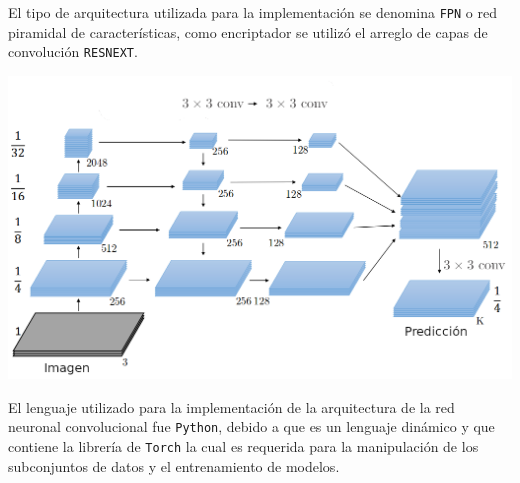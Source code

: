 \documentclass[a0,portrait]{a0poster}
\begin{document}
\begin{multicols}{3}
El tipo de arquitectura utilizada para la implementación se denomina \texttt{FPN} o red piramidal de características, como encriptador se utilizó el arreglo de capas de convolución \texttt{RESNEXT}.
\begin{center}
    \includegraphics[scale=0.70]{fpn_ar_esp_2.png}
    \label{fig:fpn_map}
\end{center}

El lenguaje utilizado para la implementación de la arquitectura de la red neuronal convolucional fue \texttt{Python}, debido a que es un lenguaje dinámico y que contiene la librería de \texttt{Torch} la cual es requerida para la manipulación de los subconjuntos de datos y el entrenamiento de modelos.

\renewcommand{\lstlistingname}{Código}


\lstset{style=pystyle}


\end{multicols}
\end{document}
